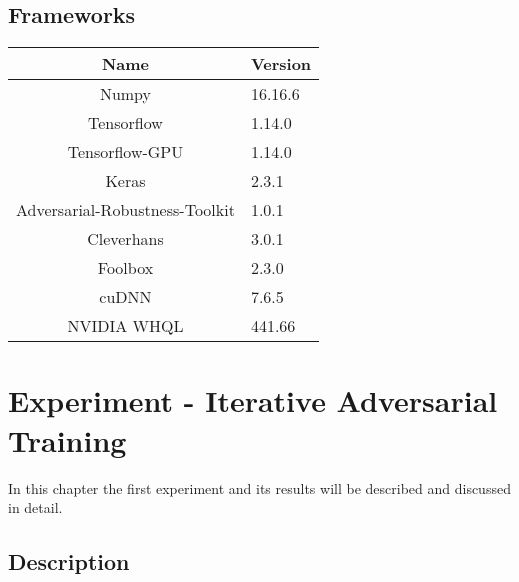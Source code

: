 \documentclass[draft,final]{vutinfth} %
\begin{document}
\section{Frameworks}

\begin{table}[h]
  \centering
  \begin{tabular}{cl}
    \toprule
Name                                    & Version   \\
    \midrule
    Numpy                               & 16.16.6	  \\
    Tensorflow                          & 1.14.0    \\
    Tensorflow-GPU                      & 1.14.0    \\
    Keras                               & 2.3.1     \\
    Adversarial-Robustness-Toolkit      & 1.0.1     \\
    Cleverhans                          & 3.0.1     \\
    Foolbox                             & 2.3.0     \\
		cuDNN																&	7.6.5			\\
		NVIDIA WHQL													& 441.66		\\
		
    
    \bottomrule
  \end{tabular}
\end{table}


\chapter{Experiment - Iterative Adversarial Training}
In this chapter the first experiment and its results will be described and discussed in detail.

\section{Description}
\end{document}
